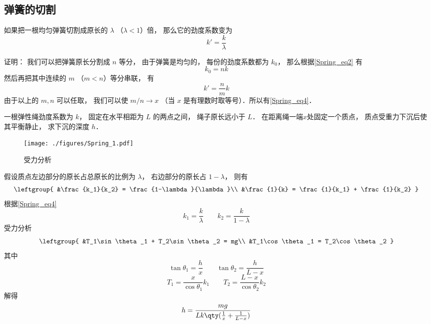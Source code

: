\subsection{弹簧的切割}
如果把一根均匀弹簧切割成原长的 $\lambda$ （$\lambda < 1$）倍， 那么它的劲度系数变为
\begin{equation}\label{Spring_eq4}
k' = \frac{k}{\lambda}
\end{equation}

证明： 我们可以把弹簧原长分割成 $n$ 等分， 由于弹簧是均匀的， 每份的劲度系数都为 $k_0$， 那么根据\autoref{Spring_eq2} 有
\begin{equation}
k_0 = nk
\end{equation}
然后再把其中连续的 $m$ （$m < n$）等分串联， 有
\begin{equation}
k' = \frac{n}{m}k
\end{equation}
由于以上的 $m, n$ 可以任取， 我们可以使 $m/n \to x$ （当 $x$ 是有理数时取等号）．所以有\autoref{Spring_eq4}．

\begin{example}{}
一根弹性绳劲度系数为 $k$， 固定在水平相距为 $L$ 的两点之间， 绳子原长远小于 $L$． 在距离绳一端$x$处固定一个质点， 质点受重力下沉后使其平衡静止， 求下沉的深度 $h$．
\begin{figure}[ht]
\centering
\texttt{[image: ./figures/Spring\_1.pdf]}
\caption{受力分析} \label{Spring_fig1}
\end{figure}
假设质点左边部分的原长占总原长的比例为 $\lambda$， 右边部分的原长占 $1-\lambda$， 则有
\begin{equation}
\leftgroup{
&\frac{k_1}{k_2} = \frac{1-\lambda}{\lambda}\\
&\frac{1}{k} = \frac{1}{k_1} + \frac{1}{k_2}
}
\end{equation}
根据\autoref{Spring_eq4} 
\begin{equation}
k_1 = \frac{k}{\lambda} \qquad
k_2 = \frac{k}{1-\lambda}
\end{equation}
受力分析
\begin{equation}
\leftgroup{
&T_1\sin\theta_1 + T_2\sin\theta_2 = mg\\
&T_1\cos\theta_1 = T_2\cos\theta_2
}
\end{equation}
其中
\begin{equation}
\tan\theta_1 = \frac{h}{x}
\qquad
\tan\theta_2 = \frac{h}{L-x}
\end{equation}
\begin{equation}
T_1 = \frac{x}{\cos\theta_1} k_1 \qquad
T_2 = \frac{L-x}{\cos\theta_2} k_2
\end{equation}
解得
\begin{equation}
h = \frac{mg}{Lk\qty(\frac{1}{x} + \frac{1}{L-x})}
\end{equation}
\end{example}
